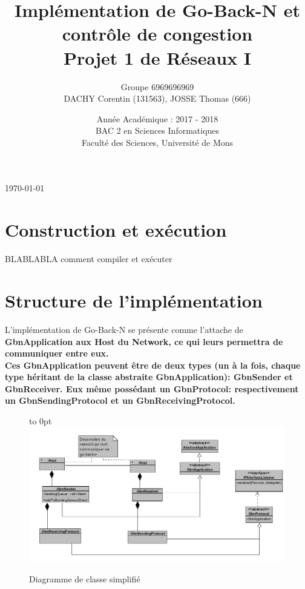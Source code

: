 \documentclass[11pt]{article}
\begin{document}
\title{ \huge
  Implémentation de Go-Back-N et contrôle de congestion \\
  \Large Projet 1 de Réseaux I \\}

\author{Groupe 6969696969\\DACHY Corentin (131563), JOSSE Thomas (666)}

\date{Année Académique : 2017 - 2018\\
BAC 2 en Sciences Informatiques\\
\vspace{1cm}
Faculté des Sciences, Université de Mons}

\maketitle

\bigskip
\begin{center} \today \end{center}

\newpage

\section{Construction et exécution}
BLABLABLA comment compiler et exécuter


\section{Structure de l'implémentation}

L'implémentation de Go-Back-N se présente comme l'attache de \bfseries GbnApplication \mdseries aux Host du Network, ce qui leurs permettra de communiquer entre eux. \\
Ces GbnApplication peuvent être de deux types (un à la fois, chaque type héritant de la classe abstraite GbnApplication): \bfseries GbnSender \mdseries  et \bfseries GbnReceiver\mdseries. Eux même possédant un \bfseries GbnProtocol\mdseries : respectivement un \bfseries GbnSendingProtocol \mdseries et un \bfseries GbnReceivingProtocol\mdseries .

\begin{figure}[h]
  \hfill\hbox to 0pt{\hss\includegraphics[scale=0.86]{bwuml.png}\hss}\hfill\null
  \caption{Diagramme de classe simplifié}
\end{figure}
\end{document}
